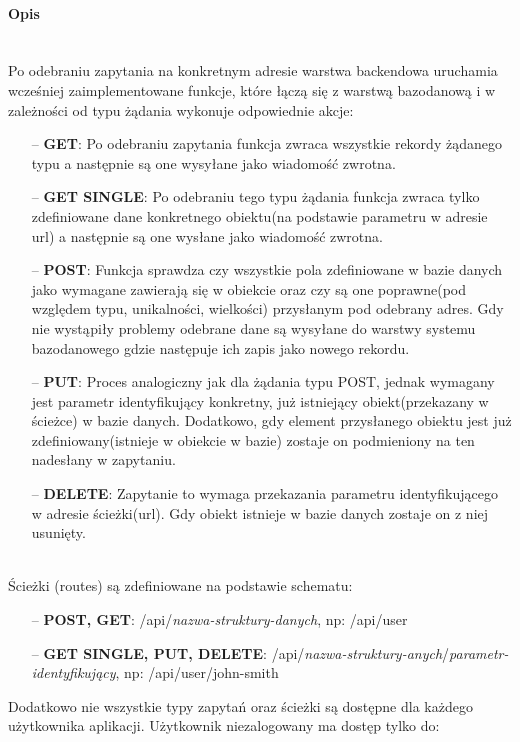 \documentclass[eng,printmode]{mgr}
\begin{document}
\paragraph{Opis}\ \\
Po odebraniu zapytania na konkretnym adresie warstwa backendowa uruchamia wcześniej zaimplementowane funkcje, które łączą się z warstwą bazodanową i w zależności od typu żądania wykonuje odpowiednie akcje:
\begin{itemize}
  \item[--] \textbf{GET}: Po odebraniu zapytania funkcja zwraca wszystkie rekordy żądanego typu a następnie są one wysyłane jako wiadomość zwrotna.
  \item[--] \textbf{GET SINGLE}: Po odebraniu tego typu żądania funkcja zwraca tylko zdefiniowane dane konkretnego obiektu(na podstawie parametru w adresie url) a następnie są one wysłane jako wiadomość zwrotna.
  \item[--] \textbf{POST}: Funkcja sprawdza czy wszystkie pola zdefiniowane w bazie danych jako wymagane zawierają się w obiekcie oraz czy są one poprawne(pod względem typu, unikalności, wielkości) przysłanym pod odebrany adres. Gdy nie wystąpiły problemy odebrane dane są wysyłane do warstwy systemu bazodanowego gdzie następuje ich zapis jako nowego rekordu.
  \item[--] \textbf{PUT}: Proces analogiczny jak dla żądania typu POST, jednak wymagany jest parametr identyfikujący konkretny, już istniejący obiekt(przekazany w ścieżce) w bazie danych. Dodatkowo, gdy element przysłanego obiektu jest już zdefiniowany(istnieje w obiekcie w bazie) zostaje on podmieniony na ten nadesłany w zapytaniu.
  \item[--] \textbf{DELETE}: Zapytanie to wymaga przekazania parametru identyfikującego w adresie ścieżki(url). Gdy obiekt istnieje w bazie danych zostaje on z niej usunięty.
\end{itemize}
\ \\
Ścieżki (routes) są zdefiniowane na podstawie schematu:
\begin{itemize}
  \item[--] \textbf{POST, GET}: /api/\textit{nazwa-struktury-danych}, np: /api/user
  \item[--] \textbf{GET SINGLE, PUT, DELETE}: /api/\textit{nazwa-struktury-anych}/\textit{parametr-identyfikujący}, np: /api/user/john-smith
\end{itemize}
Dodatkowo nie wszystkie typy zapytań oraz ścieżki są dostępne dla każdego użytkownika aplikacji. Użytkownik niezalogowany ma dostęp tylko do:
\end{document}

